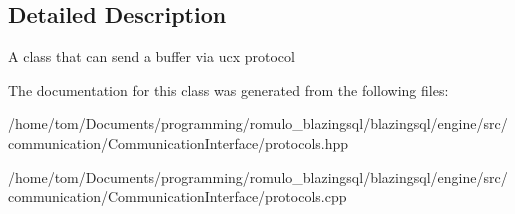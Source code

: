 \subsection{Detailed Description}
A class that can send a buffer via ucx protocol 

The documentation for this class was generated from the following files\+:\begin{DoxyCompactItemize}
\item 
/home/tom/\+Documents/programming/romulo\+\_\+blazingsql/blazingsql/engine/src/communication/\+Communication\+Interface/protocols.\+hpp\item 
/home/tom/\+Documents/programming/romulo\+\_\+blazingsql/blazingsql/engine/src/communication/\+Communication\+Interface/protocols.\+cpp\end{DoxyCompactItemize}
